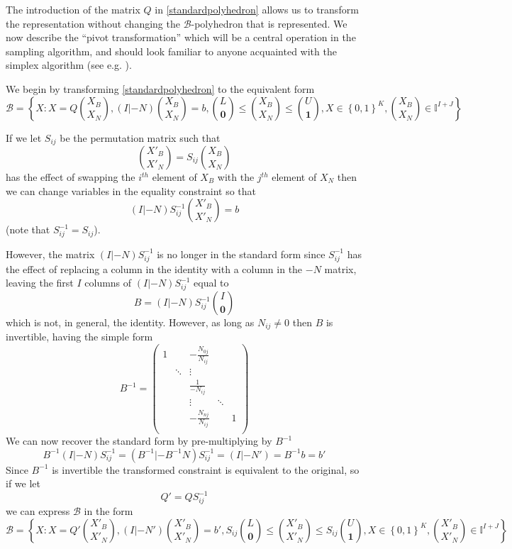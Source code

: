 \documentclass{article}
\begin{document}
The introduction of the matrix $Q$ in \eqref{standardpolyhedron} allows us to transform the representation without changing the $\mathcal{B}$-polyhedron that is represented. We now describe the ``pivot transformation'' which will be a central operation in the sampling algorithm, and should look familiar to anyone acquainted with the simplex algorithm (see e.g. \cite{vanderbei2015linear}).

We begin by transforming \eqref{standardpolyhedron} to the equivalent form
\begin{equation}
\mathcal{B} = \left\{X: X = Q{X_B\choose X_N}, (I|-N){X_B\choose X_N} = b, {L\choose \mathbf{0}} \le {X_B \choose X_N} \le {U\choose \mathbf{1}}, X \in \left\{ 0,1\right\}^K, {X_B\choose X_N} \in \mathbb{I}^{I+J} \right\}
\label{joinedpolyhedron}
\end{equation}

If we let $S_{ij}$ be the permutation matrix such that
\[
{X'_B\choose X'_N} = S_{ij}{X_B\choose X_N}
\]
has the effect of swapping the $i^{th}$ element of $X_B$ with the $j^{th}$ element of $X_N$ then we can change variables in the equality constraint so that
\[
(I|-N)S^{-1}_{ij}{X'_B \choose X'_N} = b
\]
(note that $S^{-1}_{ij} = S_{ij}$).

However, the matrix $(I|-N)S^{-1}_{ij}$ is no longer in the standard form since $S^{-1}_{ij}$ has the effect of replacing a column in the identity with a column in the $-N$ matrix, leaving the first $I$ columns of $(I|-N)S^{-1}_{ij}$ equal to
\[
B = (I|-N)S^{-1}_{ij}{I \choose \mathbf{0}}
\]
which is not, in general, the identity. However, as long as $N_{ij} \ne 0$ then $B$ is invertible, having the simple form
\[
B^{-1} =  
\begin{pmatrix}
1 &  & -\frac{N_{0j}}{N_{ij}} & & \\
  & \ddots & \vdots & &\\
 & & \frac{1}{-N_{ij}} & &\\
  & & \vdots & \ddots &\\
  & & -\frac{N_{nj}}{N_{ij}} & &1\\
\end{pmatrix}
\]
We can now recover the standard form by pre-multiplying by $B^{-1}$
\[
B^{-1}(I|-N)S^{-1}_{ij} = (B^{-1}|-B^{-1}N)S^{-1}_{ij} = (I|-N') = B^{-1}b  = b'
\]
Since $B^{-1}$ is invertible the transformed constraint is equivalent to the original, so if we let
\[
Q' = QS^{-1}_{ij}
\]
we can express $\mathcal{B}$ in the form
\begin{equation}
\mathcal{B} = \left\{X: X = Q'{X'_B\choose X'_N}, (I|-N'){X'_B\choose X'_N} = b', S_{ij}{L\choose \mathbf{0}} \le {X'_B \choose X'_N} \le S_{ij}{U\choose \mathbf{1}}, X \in \left\{ 0,1\right\}^K, {X'_B\choose X'_N} \in \mathbb{I}^{I+J} \right\}
\end{equation}
\end{document}

